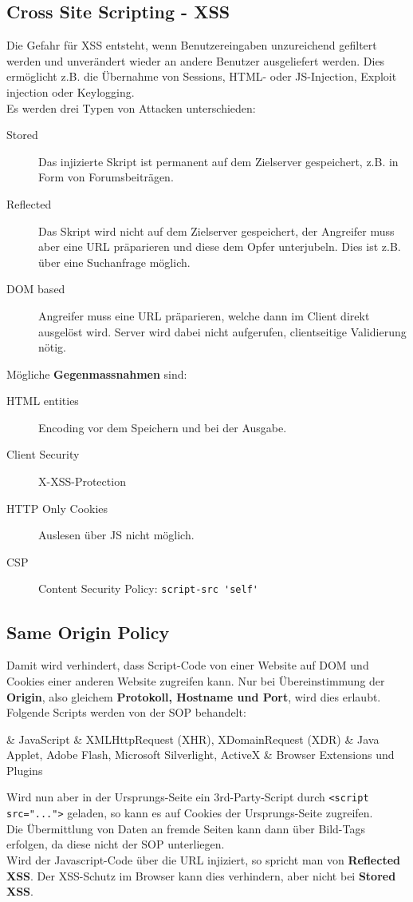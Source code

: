 \subsection{Cross Site Scripting - XSS}
Die Gefahr für XSS entsteht, wenn Benutzereingaben unzureichend gefiltert werden und unverändert wieder an andere Benutzer ausgeliefert werden. Dies ermöglicht z.B. die Übernahme von Sessions, HTML- oder JS-Injection, Exploit injection oder Keylogging.\\
Es werden drei Typen von Attacken unterschieden:
\begin{description}
	\item[Stored] Das injizierte Skript ist permanent auf dem Zielserver gespeichert, z.B. in Form von Forumsbeiträgen.
	\item[Reflected] Das Skript wird nicht auf dem Zielserver gespeichert, der Angreifer muss aber eine URL präparieren und diese dem Opfer unterjubeln. Dies ist z.B. über eine Suchanfrage möglich.
	\item[DOM based] Angreifer muss eine URL präparieren, welche dann im Client direkt ausgelöst wird. Server wird dabei nicht aufgerufen, clientseitige Validierung nötig.
\end{description}

Mögliche \textbf{Gegenmassnahmen} sind:
\begin{description}
	\item[HTML entities] Encoding vor dem Speichern und bei der Ausgabe.
	\item[Client Security] X-XSS-Protection
	\item[HTTP Only Cookies] Auslesen über JS nicht möglich.
	\item[CSP] Content Security Policy: \lstinline|script-src 'self'|
\end{description}

\subsection{Same Origin Policy}
Damit wird verhindert, dass Script-Code von einer Website auf DOM und Cookies einer anderen Website zugreifen kann. Nur bei Übereinstimmung der \textbf{Origin}, also gleichem \textbf{Protokoll, Hostname und Port}, wird dies erlaubt.\\
Folgende Scripts werden von der SOP behandelt:
\begin{easylist}[itemize]
	& JavaScript
	& XMLHttpRequest (XHR), XDomainRequest (XDR)
	& Java Applet, Adobe Flash, Microsoft Silverlight, ActiveX
	& Browser Extensions und Plugins
\end{easylist}
Wird nun aber in der Ursprungs-Seite ein 3rd-Party-Script durch \lstinline|<script src="...">| geladen, so kann es auf Cookies der Ursprungs-Seite zugreifen.\\
Die Übermittlung von Daten an fremde Seiten kann dann über Bild-Tags erfolgen, da diese nicht der SOP unterliegen.\\
Wird der Javascript-Code über die URL injiziert, so spricht man von \textbf{Reflected XSS}. Der XSS-Schutz im Browser kann dies verhindern, aber nicht bei \textbf{Stored XSS}.

